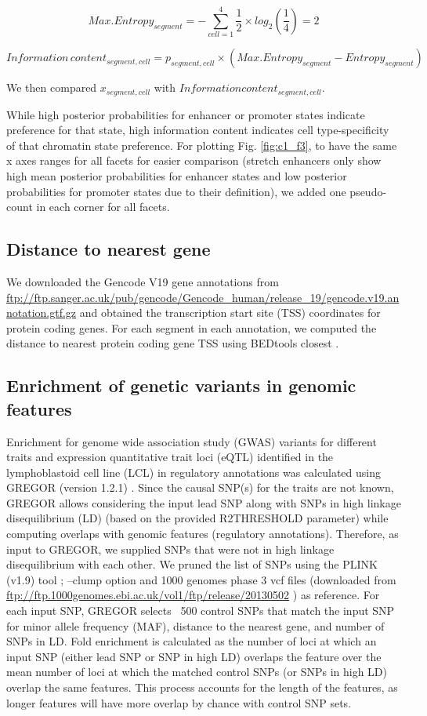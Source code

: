 \[ Max. Entropy_{segment} = -\sum_{cell=1}^{4}\frac{1}{2} \times log_2(\frac{1}{4}) = 2 \]

\[ Information\, content_{segment,cell} = p_{segment, cell} \times (Max. Entropy_{segment} - Entropy_{segment}) \]

We then compared \(x_{segment, cell}\) with \(Information content_{segment, cell}\).

While high posterior probabilities for enhancer or promoter states indicate preference for that state, high information content indicates cell type-specificity of that chromatin state preference. For plotting Fig. \ref{fig:c1_f3}, to have the same x axes ranges for all facets for easier comparison (stretch enhancers only show high mean posterior probabilities for enhancer states and low posterior probabilities for promoter states due to their definition), we added one pseudo-count in each corner for all facets.

\subsection{Distance to nearest gene}
We downloaded the Gencode V19 gene annotations from \url{ftp://ftp.sanger.ac.uk/pub/gencode/Gencode_human/release_19/gencode.v19.annotation.gtf.gz} and obtained the transcription start site (TSS) coordinates for protein coding genes. For each segment in each annotation, we computed the distance to nearest protein coding gene TSS using BEDtools closest \cite{quinlanBEDToolsFlexibleSuite2010}.

\subsection{Enrichment of genetic variants in genomic features}
Enrichment for genome wide association study (GWAS) variants for different traits and expression quantitative trait loci (eQTL) identified in the lymphoblastoid cell line (LCL) in regulatory annotations was calculated using GREGOR (version 1.2.1) \cite{schmidtGREGOREvaluatingGlobal2015}. Since the causal SNP(s) for the traits are not known, GREGOR allows considering the input lead SNP along with SNPs in high linkage disequilibrium (LD) (based on the provided R2THRESHOLD parameter) while computing overlaps with genomic features (regulatory annotations). Therefore, as input to GREGOR, we supplied SNPs that were not in high linkage disequilibrium with each other. We pruned the list of SNPs using the PLINK (v1.9) tool \cite{purcellPLINKToolSet2007}; \cite{changSecondgenerationPLINKRising2015} –clump option and 1000 genomes phase 3 vcf files (downloaded from \url{ftp://ftp.1000genomes.ebi.ac.uk/vol1/ftp/release/20130502} ) as reference. For each input SNP, GREGOR selects ~500 control SNPs that match the input SNP for minor allele frequency (MAF), distance to the nearest gene, and number of SNPs in LD. Fold enrichment is calculated as the number of loci at which an input SNP (either lead SNP or SNP in high LD) overlaps the feature over the mean number of loci at which the matched control SNPs (or SNPs in high LD) overlap the same features. This process accounts for the length of the features, as longer features will have more overlap by chance with control SNP sets.\\

